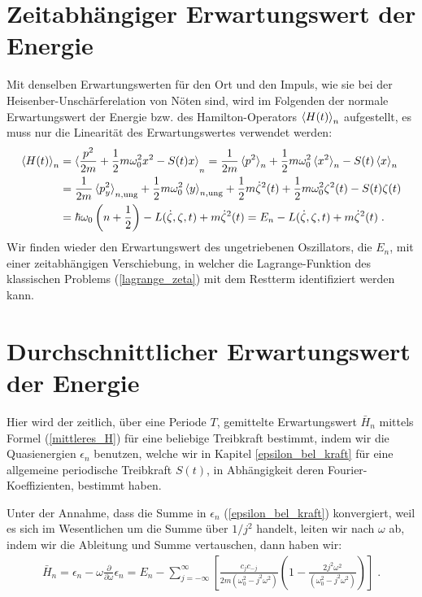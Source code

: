   \section{Zeitabhängiger Erwartungswert der Energie}
    Mit denselben Erwartungswerten für den Ort und den Impuls, wie sie bei der Heisenber-Unschärferelation von Nöten sind, wird im Folgenden der normale Erwartungswert der Energie bzw. des Hamilton-Operators $\braket{H(t)}_n$ aufgestellt, es muss nur die Linearität des Erwartungswertes verwendet werden:
    \begin{align}
      \braket{H(t)}_n &= \braket{\frac{p^2}{2m} + \frac{1}{2}m\omega_0^2x^2 - S(t)x}_n
      =\frac{1}{2m}\braket{p^2}_n + \frac{1}{2}m\omega_0^2\braket{x^2}_n - S(t)\braket{x}_n \notag\\
      &= \frac{1}{2m}\braket{p^2_y}_{n,\text{ung}} + \frac{1}{2}m\omega_0^2\braket{y}_{n,\text{ung}} + \frac{1}{2}m\dot{\zeta}^2(t) + \frac{1}{2}m\omega_0^2\zeta^2(t) - S(t)\zeta(t) \notag\\
      &= \hbar\omega_0\left(n+\frac{1}{2}\right) - L(\dot{\zeta},\zeta,t) + m\dot{\zeta}^2(t) = E_n - L(\dot{\zeta},\zeta,t) + m\dot{\zeta}^2(t) \; .
    \end{align}
    Wir finden wieder den Erwartungswert des ungetriebenen Oszillators, die $E_n$, mit einer zeitabhängigen Verschiebung, in welcher die Lagrange-Funktion des klassischen Problems (\ref{lagrange_zeta}) mit dem Restterm identifiziert werden kann.

  \section{Durchschnittlicher Erwartungswert der Energie}
    Hier wird der zeitlich, über eine Periode $T$, gemittelte Erwartungswert $\bar H_n$ mittels Formel (\ref{mittleres_H}) für eine beliebige Treibkraft bestimmt, indem wir die Quasienergien $\epsilon_n$ benutzen, welche wir in Kapitel \ref{epsilon_bel_kraft} für eine allgemeine periodische Treibkraft $S(t)$, in Abhängigkeit deren Fourier-Koeffizienten, bestimmt haben.

    Unter der Annahme, dass die Summe in $\epsilon_n$ (\ref{epsilon_bel_kraft}) konvergiert, weil es sich im Wesentlichen um die Summe über $1/j^2$ handelt, leiten wir nach $\omega$ ab, indem wir die Ableitung und Summe vertauschen, dann haben wir:
    \begin{align}
      \bar H_n = \epsilon_n - \omega\frac{\partial}{\partial \omega}\epsilon_n
      = E_n - \sum_{j=-\infty}^{\infty} \left[ \frac{c_jc_{-j}}{2m(\omega_0^2-j^2\omega^2)}\left( 1-\frac{2j^2\omega^2}{(\omega_0^2-j^2\omega^2)}\right) \right] \; .
    \end{align}

